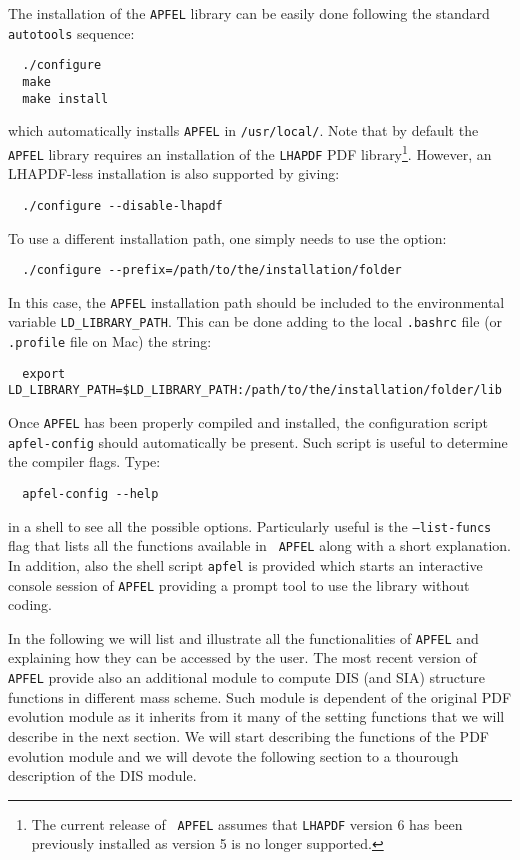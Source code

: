 \documentclass[11pt,a4paper]{article}
\begin{document}
The installation of the {\tt APFEL} library can be easily done
following the standard {\tt autotools} sequence:
\begin{lstlisting}
  ./configure
  make
  make install
\end{lstlisting}
which automatically installs {\tt APFEL} in {\tt /usr/local/}. Note
that by default the {\tt APFEL} library requires an installation of
the {\tt LHAPDF} PDF library\footnote{The current release of {\tt
    APFEL} assumes that {\tt LHAPDF} version 6 has been previously
  installed as version 5 is no longer supported.}. However, an
LHAPDF-less installation is also supported by giving:
\begin{lstlisting}
  ./configure --disable-lhapdf
\end{lstlisting}
To use a different installation path, one simply needs to
use the option:
\begin{lstlisting}
  ./configure --prefix=/path/to/the/installation/folder
\end{lstlisting}
In this case, the {\tt APFEL} installation path should be included to
the environmental variable {\tt LD\_LIBRARY\_PATH}. This can be done
adding to the local {\tt .bashrc} file (or {\tt .profile} file on Mac)
the string:
\begin{lstlisting}
  export LD_LIBRARY_PATH=$LD_LIBRARY_PATH:/path/to/the/installation/folder/lib
\end{lstlisting}

Once {\tt APFEL} has been properly compiled and installed, the
configuration script {\tt apfel-config} should automatically be
present. Such script is useful to determine the compiler flags. Type:
\begin{lstlisting}
  apfel-config --help
\end{lstlisting}
in a shell to see all the possible options. Particularly useful is the
{\tt --list-funcs} flag that lists all the functions available in {\tt
  APFEL} along with a short explanation. In addition, also the shell
script {\tt apfel} is provided which starts an interactive console
session of {\tt APFEL} providing a prompt tool to use the library
without coding.

In the following we will list and illustrate all the functionalities
of {\tt APFEL} and explaining how they can be accessed by the
user. The most recent version of {\tt APFEL} provide also an
additional module to compute DIS (and SIA) structure functions in
different mass scheme. Such module is dependent of the original PDF
evolution module as it inherits from it many of the setting functions
that we will describe in the next section. We will start describing
the functions of the PDF evolution module and we will devote the
following section to a thourough description of the DIS module.
\end{document}
